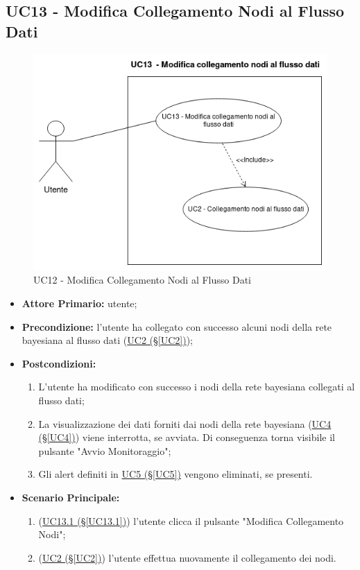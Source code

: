 \pagebreak

\subsection{UC13 - Modifica Collegamento Nodi al Flusso Dati}\label{UC13}

\begin{figure}[H]
\centering
\includegraphics[scale=0.6]{./images/UC13.png}
\caption{UC12 - Modifica Collegamento Nodi al Flusso Dati}
\end{figure}


\begin{itemize}
\item \textbf{Attore Primario:} utente;
\item \textbf{Precondizione:} l'utente ha collegato con successo alcuni nodi della rete bayesiana al flusso dati (\hyperref[UC2]{UC2 (§\ref*{UC2})});
\item \textbf{Postcondizioni:} 
	\begin{enumerate}
	\item L'utente ha modificato con successo i nodi della rete bayesiana collegati al flusso dati;
	\item La visualizzazione dei dati forniti dai nodi della rete bayesiana (\hyperref[UC4]{UC4 (§\ref*{UC4})}) viene interrotta, se avviata. Di conseguenza torna visibile il pulsante "Avvio Monitoraggio";
	\item Gli alert definiti in \hyperref[UC5]{UC5 (§\ref*{UC5})} vengono eliminati, se presenti.
	\end{enumerate}
\item \textbf{Scenario Principale:}
	\begin{enumerate}
	\item (\hyperref[UC13.1]{UC13.1 (§\ref*{UC13.1})}) l'utente clicca il pulsante "Modifica Collegamento Nodi";
	\item (\hyperref[UC2]{UC2 (§\ref*{UC2})}) l'utente effettua nuovamente il collegamento dei nodi.
	\end{enumerate}
\end{itemize}

